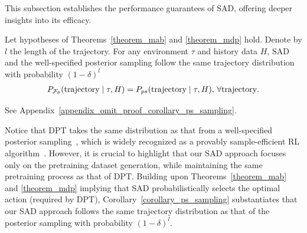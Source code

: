 This subsection establishes the performance guarantees of SAD, offering deeper insights into its efficacy.
%
%
%
\begin{corollary}
\label{corollary_ps_sampling}
Let hypotheses of Theorems~\ref{theorem_mab}  and \ref{theorem_mdp} hold. Denote by $l$ the length of the trajectory.
For any environment $\tau$ and history data $H$, SAD and the well-specified posterior sampling follow the same trajectory distribution with probability $(1-\delta)^l$
\begin{align}
    P_{{\mathcal F}_{\theta}} (\text{trajectory}  \mid  \tau, H) = P_{ps}(\text{trajectory} \mid \tau, H), \, \forall \text{trajectory}.
\end{align}
%
\end{corollary}
%
\begin{myproof}
    See Appendix~\ref{appendix_omit_proof_corollary_ps_sampling}.
\end{myproof}
%
Notice that DPT takes the same distribution as that from a well-specified posterior sampling~\citep{lee2024supervised}, which is widely recognized as a provably sample-efficient RL algorithm~\citep{osband2013more}.
%
However, it is crucial to highlight that our SAD approach focuses only on the pretraining dataset generation, while maintaining the same pretraining process as that of DPT. Building upon Theorems~\ref{theorem_mab} and \ref{theorem_mdp} implying that SAD probabilistically selects the optimal action (required by DPT), Corollary~\ref{corollary_ps_sampling} substantiates that our SAD approach follows the same trajectory distribution as that of the posterior sampling with probability $(1-\delta)^l$.



